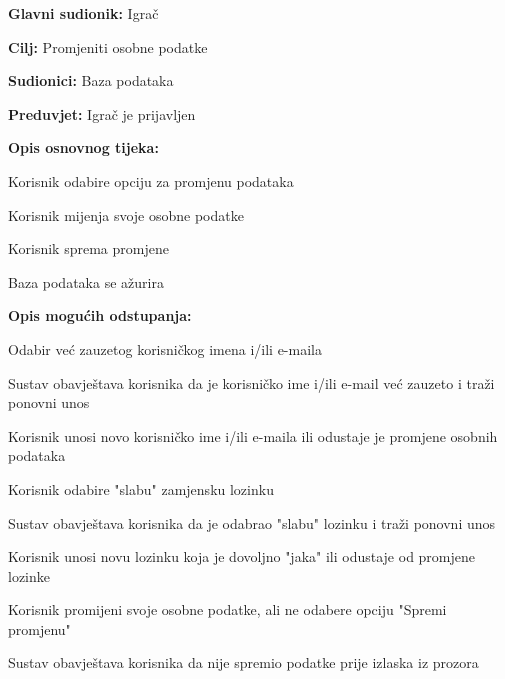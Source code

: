 					\noindent {}
					\begin{packed_item}
					
					\item \textbf{Glavni sudionik: }Igrač
					\item  \textbf{Cilj:} Promjeniti osobne podatke
					\item  \textbf{Sudionici:} Baza podataka
					\item  \textbf{Preduvjet:} Igrač je prijavljen
					\item  \textbf{Opis osnovnog tijeka:}
					
					\item[] \begin{packed_enum}
						
						\item Korisnik odabire opciju za promjenu podataka
						\item Korisnik mijenja svoje osobne podatke
						\item Korisnik sprema promjene
						\item Baza podataka se ažurira
					\end{packed_enum}
					
					\item  \textbf{Opis mogućih odstupanja:}
					
					\item[] \begin{packed_item}
						
						\item Odabir već zauzetog korisničkog imena i/ili e-maila
						\item[] \begin{packed_enum}
							
							\item Sustav obavještava korisnika da je korisničko ime i/ili e-mail već zauzeto i traži ponovni unos
							\item Korisnik unosi novo korisničko ime i/ili e-maila ili odustaje je promjene osobnih podataka
							
						\end{packed_enum}
						\item Korisnik odabire "slabu" zamjensku lozinku
						\item[] \begin{packed_enum}
							\item Sustav obavještava korisnika da je odabrao "slabu" lozinku i traži ponovni unos
							\item Korisnik unosi novu lozinku koja je dovoljno "jaka" ili odustaje od promjene lozinke
						\end{packed_enum}
						\item Korisnik promijeni svoje osobne podatke, ali ne odabere opciju "Spremi promjenu"
						\item[] \begin{packed_enum}
							\item Sustav obavještava korisnika da nije spremio podatke prije izlaska iz prozora
						\end{packed_enum}
						

\end{packed_item}
\end{packed_item}
